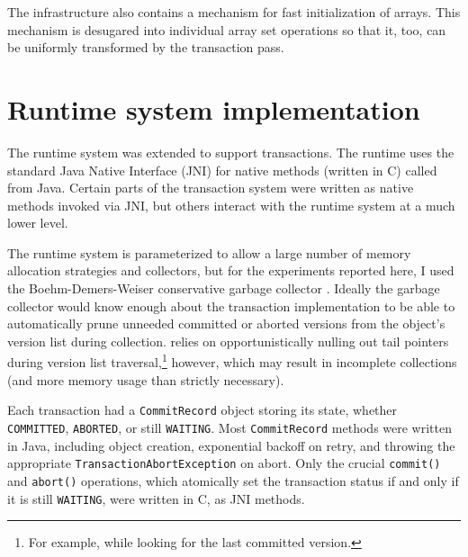 The \flex infrastructure also contains a mechanism for fast
initialization of arrays.  This mechanism is desugared into
individual array set operations so that it, too, can be uniformly
transformed by the transaction pass.

\section{Runtime system implementation}
The \flex runtime system was extended to support transactions.  The
runtime uses the standard Java Native Interface (JNI) \cite{JNI} for
native methods (written in C) called from Java.  Certain parts of the
transaction system were written as native methods invoked via JNI, but
others interact with the runtime system at a much lower level.
  
The runtime system is parameterized to allow a large number of memory
allocation strategies and collectors, but for the experiments reported
here, I used the Boehm-Demers-Weiser conservative garbage collector
\cite{BoehmDeWe91}.
Ideally the garbage collector would know enough about the transaction
implementation to be able to automatically prune unneeded committed or
aborted versions from the object's version list during collection.
\Flex relies on opportunistically nulling out tail pointers
during version list traversal,\footnote{For example, while looking for the
last committed version.} however, which may result in incomplete collections
(and more memory usage than strictly necessary).

Each transaction had a \texttt{CommitRecord} object storing its state,
whether \texttt{COMMITTED}, \texttt{ABORTED}, or still
\texttt{WAITING}\@.  Most \texttt{CommitRecord} methods were written in
Java, including object creation, exponential backoff on retry, and
throwing the appropriate \texttt{TransactionAbortException} on abort.
Only the crucial \texttt{commit()} and \texttt{abort()} operations,
which atomically set the transaction status if and only if it is still
\texttt{WAITING}, were written in C, as JNI methods.

